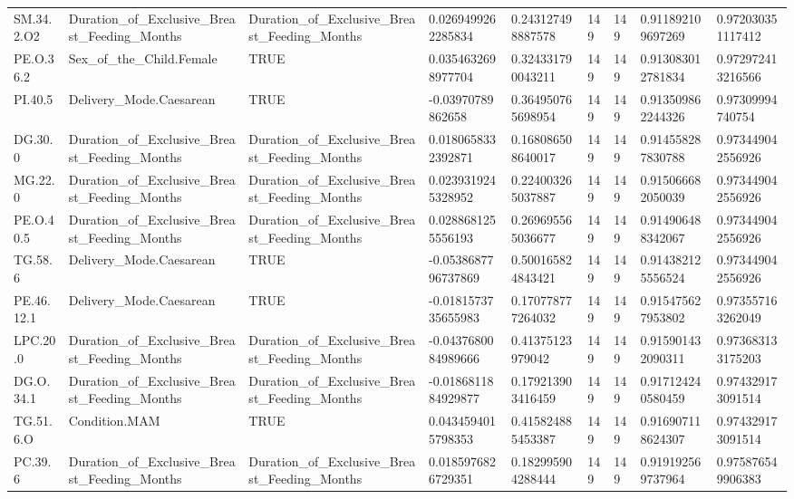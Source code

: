 \begin{longtable}{lllllllll}
SM.34.2.O2 & Duration\_of\_Exclusive\_Breast\_Feeding\_Months & Duration\_of\_Exclusive\_Breast\_Feeding\_Months & 0.0269499262285834 & 0.243127498887578 & 149 & 149 & 0.911892109697269 & 0.972030351117412 \\
PE.O.36.2 & Sex\_of\_the\_Child.Female & TRUE & 0.0354632698977704 & 0.324331790043211 & 149 & 149 & 0.913083012781834 & 0.972972413216566 \\
PI.40.5 & Delivery\_Mode.Caesarean & TRUE & -0.03970789862658 & 0.364950765698954 & 149 & 149 & 0.913509862244326 & 0.97309994740754 \\
DG.30.0 & Duration\_of\_Exclusive\_Breast\_Feeding\_Months & Duration\_of\_Exclusive\_Breast\_Feeding\_Months & 0.0180658332392871 & 0.168086508640017 & 149 & 149 & 0.914558287830788 & 0.973449042556926 \\
MG.22.0 & Duration\_of\_Exclusive\_Breast\_Feeding\_Months & Duration\_of\_Exclusive\_Breast\_Feeding\_Months & 0.0239319245328952 & 0.224003265037887 & 149 & 149 & 0.915066682050039 & 0.973449042556926 \\
PE.O.40.5 & Duration\_of\_Exclusive\_Breast\_Feeding\_Months & Duration\_of\_Exclusive\_Breast\_Feeding\_Months & 0.0288681255556193 & 0.269695565036677 & 149 & 149 & 0.914906488342067 & 0.973449042556926 \\
TG.58.6 & Delivery\_Mode.Caesarean & TRUE & -0.0538687796737869 & 0.500165824843421 & 149 & 149 & 0.914382125556524 & 0.973449042556926 \\
PE.46.12.1 & Delivery\_Mode.Caesarean & TRUE & -0.0181573735655983 & 0.170778777264032 & 149 & 149 & 0.915475627953802 & 0.973557163262049 \\
LPC.20.0 & Duration\_of\_Exclusive\_Breast\_Feeding\_Months & Duration\_of\_Exclusive\_Breast\_Feeding\_Months & -0.0437680084989666 & 0.41375123979042 & 149 & 149 & 0.915901432090311 & 0.973683133175203 \\
DG.O.34.1 & Duration\_of\_Exclusive\_Breast\_Feeding\_Months & Duration\_of\_Exclusive\_Breast\_Feeding\_Months & -0.0186811884929877 & 0.179213903416459 & 149 & 149 & 0.917124240580459 & 0.974329173091514 \\
TG.51.6.O & Condition.MAM & TRUE & 0.0434594015798353 & 0.415824885453387 & 149 & 149 & 0.916907118624307 & 0.974329173091514 \\
PC.39.6 & Duration\_of\_Exclusive\_Breast\_Feeding\_Months & Duration\_of\_Exclusive\_Breast\_Feeding\_Months & 0.0185976826729351 & 0.182995904288444 & 149 & 149 & 0.919192569737964 & 0.975876549906383 \\

\end{longtable}

